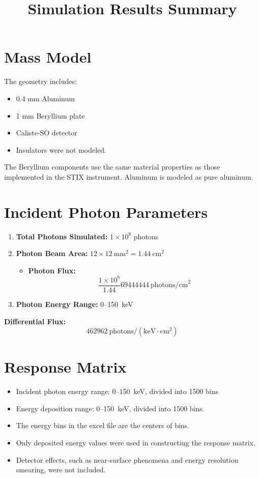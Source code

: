 \documentclass[12pt]{article}
\title{Simulation Results Summary}
\date{}
\begin{document}
\maketitle

\section{Mass Model}

The geometry includes:
\begin{itemize}
  \item 0.4 mm Aluminum
  \item 1 mm Beryllium plate  
  \item Caliste-SO detector
  \item Insulators  were not modeled.
\end{itemize}

The Beryllium components use the same material properties as those implemented in the STIX instrument.  
Aluminum is modeled as pure aluminum.




\section{Incident Photon Parameters}

\begin{enumerate}
  \item \textbf{Total Photons Simulated:} \( 1 \times 10^8 \) photons
  \item \textbf{Photon Beam Area:} \( 12 \times 12~\text{mm}^2 = 1.44~\text{cm}^2 \)
    \begin{itemize}
      \item \textbf{Photon Flux:} 
      \[
        \frac{1 \times 10^8}{1.44}69444444 ~\text{photons/cm}^2
      \]
    \end{itemize}
  \item \textbf{Photon Energy Range:} 0–150~keV
\end{enumerate}

\noindent \textbf{Differential Flux:} 
\[
  462962~\text{photons}/(\text{keV} \cdot \text{cm}^2)
\]

\section{Response Matrix}

\begin{itemize}
  \item Incident photon energy range: 0–150~keV, divided into 1500 bins
  \item Energy deposition range: 0–150~keV, divided into 1500 bins.
  \item The energy bins in the excel file are the centers of bins.
  \item Only deposited energy values were used in constructing the response matrix.
  \item Detector effects, such as near-surface phenomena and energy resolution smearing, were not included.
\end{itemize}
\end{document}
